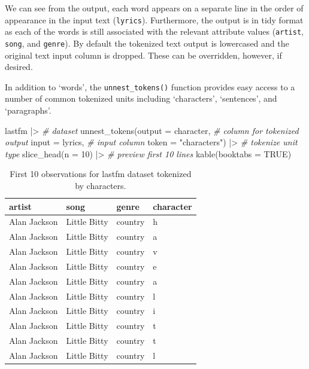 \documentclass[
  letterpaper,
]{scrbook}
\newenvironment{Shaded}{\begin{snugshade}}{\end{snugshade}}
\newcommand{\AttributeTok}[1]{\textcolor[rgb]{0.00,0.00,0.00}{#1}}
\newcommand{\CommentTok}[1]{\textcolor[rgb]{0.00,0.00,0.00}{\textit{#1}}}
\newcommand{\ConstantTok}[1]{\textcolor[rgb]{0.00,0.00,0.00}{#1}}
\newcommand{\DecValTok}[1]{\textcolor[rgb]{0.00,0.00,0.00}{#1}}
\newcommand{\FunctionTok}[1]{\textcolor[rgb]{0.00,0.00,0.00}{#1}}
\newcommand{\NormalTok}[1]{\textcolor[rgb]{0.00,0.00,0.00}{#1}}
\newcommand{\SpecialCharTok}[1]{\textcolor[rgb]{0.00,0.00,0.00}{#1}}
\newcommand{\StringTok}[1]{\textcolor[rgb]{0.00,0.00,0.00}{#1}}
\begin{document}
We can see from the output, each word appears on a separate line in the
order of appearance in the input text (\texttt{lyrics}). Furthermore,
the output is in tidy format as each of the words is still associated
with the relevant attribute values (\texttt{artist}, \texttt{song}, and
\texttt{genre}). By default the tokenized text output is lowercased and
the original text input column is dropped. These can be overridden,
however, if desired.

In addition to `words', the \texttt{unnest\_tokens()} function provides
easy access to a number of common tokenized units including
`characters', `sentences', and `paragraphs'.

\begin{Shaded}
\begin{Highlighting}[]
\NormalTok{lastfm }\SpecialCharTok{|\textgreater{}} \CommentTok{\# dataset}
  \FunctionTok{unnest\_tokens}\NormalTok{(}\AttributeTok{output =}\NormalTok{ character, }\CommentTok{\# column for tokenized output}
                \AttributeTok{input =}\NormalTok{ lyrics, }\CommentTok{\# input column}
                \AttributeTok{token =} \StringTok{"characters"}\NormalTok{) }\SpecialCharTok{|\textgreater{}} \CommentTok{\# tokenize unit type}
  \FunctionTok{slice\_head}\NormalTok{(}\AttributeTok{n =} \DecValTok{10}\NormalTok{) }\SpecialCharTok{|\textgreater{}}  \CommentTok{\# preview first 10 lines}
  \FunctionTok{kable}\NormalTok{(}\AttributeTok{booktabs =} \ConstantTok{TRUE}\NormalTok{)}
\end{Highlighting}
\end{Shaded}

\hypertarget{tbl-td-lastfm-tokenize-characters}{}
\begin{table}
\caption{\label{tbl-td-lastfm-tokenize-characters}First 10 observations for lastfm dataset tokenized by characters. }\tabularnewline

\centering
\begin{tabular}{llll}
\toprule
artist & song & genre & character\\
\midrule
Alan Jackson & Little Bitty & country & h\\
Alan Jackson & Little Bitty & country & a\\
Alan Jackson & Little Bitty & country & v\\
Alan Jackson & Little Bitty & country & e\\
Alan Jackson & Little Bitty & country & a\\
\addlinespace
Alan Jackson & Little Bitty & country & l\\
Alan Jackson & Little Bitty & country & i\\
Alan Jackson & Little Bitty & country & t\\
Alan Jackson & Little Bitty & country & t\\
Alan Jackson & Little Bitty & country & l\\
\bottomrule
\end{tabular}
\end{table}
\end{document}
